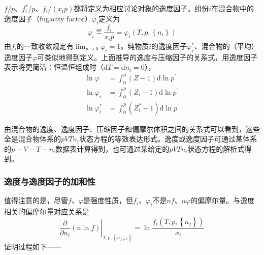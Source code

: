 \documentclass[main.tex]{subfiles}
\begin{document}
$f/p$、$f_i^*/p$、$f_i/\left(x_ip\right)$都将定义为相应讨论对象的逸度因子。组份$i$在混合物中的逸度因子（fugacity factor）$\varphi_i$定义为
\begin{equation}\label{eq:II.4_def_fugacity_factor_i}
    \varphi_i\eqdef\frac{f_i}{x_ip}=\varphi_i\left(T,p,\left\{n_i\right\}\right)
\end{equation}
由$f_i$的一致收敛规定有$\lim_{p\to 0}\varphi_i=1$。纯物质$i$的逸度因子$\varphi_i^*$、混合物的（平均）逸度因子$\varphi$可类似地得到定义。上面推导的逸度与压缩因子的关系式，用逸度因子表示将更简洁：恒温恒组成时（$\mathrm{d}T=\mathrm{d}n_i=0$），
\begin{align*}
    \ln\varphi     & =\int_0^p\left(Z-1\right)\mathrm{d}\ln p^\prime     \\
    \ln\varphi_i   & =\int_0^p\left(Z_i-1\right)\mathrm{d}\ln p^\prime   \\
    \ln\varphi^*_i & =\int_0^p\left(Z_i^*-1\right)\mathrm{d}\ln p^\prime
\end{align*}

由混合物的逸度、逸度因子、压缩因子和偏摩尔体积之间的关系式可以看到，这些全是混合物体系的$pVTn_i$状态方程的等效表达形式。逸度或逸度因子可通过某体系的$p-V-T-n_i$数据表计算得到，也可通过某给定的$pVTn_i$状态方程的解析式得到。

\subsubsection{逸度与逸度因子的加和性}
值得注意的是，尽管$f$、$\varphi$是强度性质，但$f_i$、$\varphi_i$不是$nf$、$n\varphi$的偏摩尔量。与逸度相关的偏摩尔量对应关系是
\[\left.\frac{\partial}{\partial n_i}\left(n\ln f\right)\right|_{T,p,\left\{n_{j\neq i}\right\}}=\ln\frac{f_i\left(T,p,\left\{n_j\right\}\right)}{x_i}\]
证明过程如下——
\end{document}
